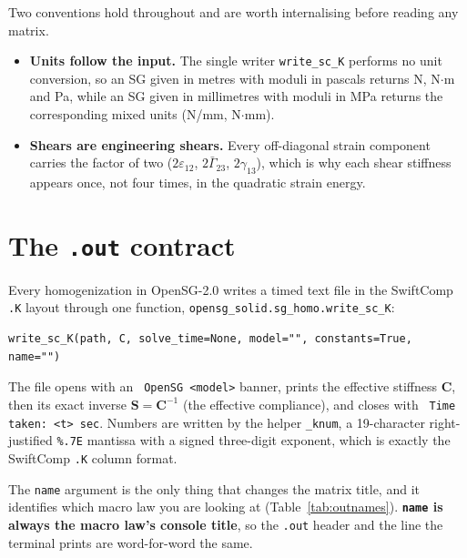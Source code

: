 Two conventions hold throughout and are worth internalising before reading any
matrix.

\begin{itemize}
\item \textbf{Units follow the input.} The single writer
  \texttt{write\_sc\_K} performs no unit conversion, so an SG given in metres
  with moduli in pascals returns N, N$\cdot$m and Pa, while an SG given in
  millimetres with moduli in MPa returns the corresponding mixed units (N/mm,
  N$\cdot$mm).
\item \textbf{Shears are engineering shears.} Every off-diagonal strain
  component carries the factor of two ($2\varepsilon_{12}$,
  $2\bar\Gamma_{23}$, $2\gamma_{13}$), which is why each shear stiffness
  appears once, not four times, in the quadratic strain energy.
\end{itemize}

\section{The \texttt{.out} contract}
\label{sec:out-contract}

Every homogenization in OpenSG-2.0 writes a timed text file in the SwiftComp
\texttt{.K} layout through one function,
\texttt{opensg\_solid.sg\_homo.write\_sc\_K}:

\begin{lstlisting}[style=opensg,caption={The single output writer. Every law in this chapter is printed by this call.}]
write_sc_K(path, C, solve_time=None, model="", constants=True, name="")
\end{lstlisting}

The file opens with an \verb| OpenSG <model>| banner, prints the effective
stiffness $\mathbf C$, then its exact inverse $\mathbf S = \mathbf C^{-1}$ (the
effective compliance), and closes with \verb| Time taken: <t> sec|. Numbers are
written by the helper \texttt{\_knum}, a 19-character right-justified
\verb|%.7E| mantissa with a signed three-digit exponent, which is exactly the
SwiftComp \texttt{.K} column format.

The \texttt{name} argument is the only thing that changes the matrix title, and
it identifies which macro law you are looking at (Table~\ref{tab:outnames}).
\textbf{\texttt{name} is always the macro law's console title}, so the
\texttt{.out} header and the line the terminal prints are word-for-word the
same.

